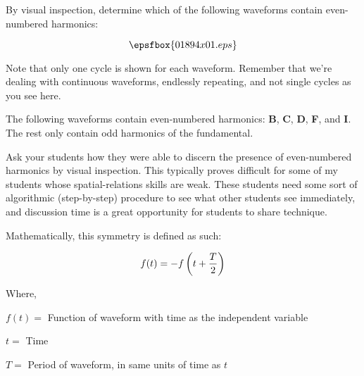 

By visual inspection, determine which of the following waveforms contain even-numbered harmonics:

$$\epsfbox{01894x01.eps}$$

Note that only one cycle is shown for each waveform.  Remember that we're dealing with continuous waveforms, endlessly repeating, and not single cycles as you see here.







The following waveforms contain even-numbered harmonics: {\bf B}, {\bf C}, {\bf D}, {\bf F}, and {\bf I}.  The rest only contain odd harmonics of the fundamental.







Ask your students how they were able to discern the presence of even-numbered harmonics by visual inspection.  This typically proves difficult for some of my students whose spatial-relations skills are weak.  These students need some sort of algorithmic (step-by-step) procedure to see what other students see immediately, and discussion time is a great opportunity for students to share technique.

Mathematically, this symmetry is defined as such:

$$f(t) = -f \left(t + {T \over 2} \right)$$

\noindent
Where,

$f(t) = $ Function of waveform with time as the independent variable

$t = $ Time

$T = $ Period of waveform, in same units of time as $t$





